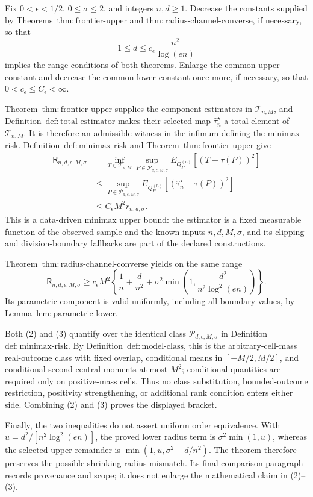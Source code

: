 Fix \(0<\epsilon<1/2\), \(0\le\sigma\le2\), and integers \(n,d\ge1\).  Decrease the constants supplied by Theorems~\(\mathrm{thm:frontier\text{-}upper}\) and \(\mathrm{thm:radius\text{-}channel\text{-}converse}\), if necessary, so that
\[
 1\le d\le c_{\epsilon}\frac{n^2}{\log(en)}
\tag{1}
\]
implies the range conditions of both theorems.  Enlarge the common upper constant and decrease the common lower constant once more, if necessary, so that \(0<c_{\epsilon}\le C_{\epsilon}<\infty\).

Theorem~\(\mathrm{thm:frontier\text{-}upper}\) supplies the component estimators in \(\mathcal T_{n,M}\), and Definition~\(\mathrm{def:total\text{-}estimator}\) makes their selected map \(\widehat\tau_n^{\star}\) a total element of \(\mathcal T_{n,M}\).  It is therefore an admissible witness in the infimum defining the minimax risk.  Definition~\(\mathrm{def:minimax\text{-}risk}\) and Theorem~\(\mathrm{thm:frontier\text{-}upper}\) give
\[
\begin{aligned}
 \mathsf R_{n,d,\epsilon,M,\sigma}
 &=\inf_{T\in\mathcal T_{n,M}}
   \sup_{P\in\mathcal P_{d,\epsilon,M,\sigma}}
   E_{Q_P^{(n)}}[(T-\tau(P))^2]\\
 &\le
   \sup_{P\in\mathcal P_{d,\epsilon,M,\sigma}}
   E_{Q_P^{(n)}}[(\widehat\tau_n^{\star}-\tau(P))^2]\\
 &\le C_{\epsilon}M^2r_{n,d,\sigma}.
\end{aligned}
\tag{2}
\]
This is a data-driven minimax upper bound: the estimator is a fixed measurable function of the observed sample and the known inputs \(n,d,M,\sigma\), and its clipping and division-boundary fallbacks are part of the declared constructions.

Theorem~\(\mathrm{thm:radius\text{-}channel\text{-}converse}\) yields on the same range
\[
 \mathsf R_{n,d,\epsilon,M,\sigma}
 \ge c_{\epsilon}M^2\left\{
 \frac1n+\frac d{n^2}
 +\sigma^2\min\left(1,\frac{d^2}{n^2\log^2(en)}\right)
 \right\}.
\tag{3}
\]
Its parametric component is valid uniformly, including all boundary values, by Lemma~\(\mathrm{lem:parametric\text{-}lower}\).

Both (2) and (3) quantify over the identical class \(\mathcal P_{d,\epsilon,M,\sigma}\) in Definition~\(\mathrm{def:minimax\text{-}risk}\).  By Definition~\(\mathrm{def:model\text{-}class}\), this is the arbitrary-cell-mass real-outcome class with fixed overlap, conditional means in \([-M/2,M/2]\), and conditional second central moments at most \(M^2\); conditional quantities are required only on positive-mass cells.  Thus no class substitution, bounded-outcome restriction, positivity strengthening, or additional rank condition enters either side.  Combining (2) and (3) proves the displayed bracket.

Finally, the two inequalities do not assert uniform order equivalence.  With \(u=d^2/[n^2\log^2(en)]\), the proved lower radius term is \(\sigma^2\min(1,u)\), whereas the selected upper remainder is \(\min(1,u,\sigma^2+d/n^2)\).  The theorem therefore preserves the possible shrinking-radius mismatch.  Its final comparison paragraph records provenance and scope; it does not enlarge the mathematical claim in (2)--(3).